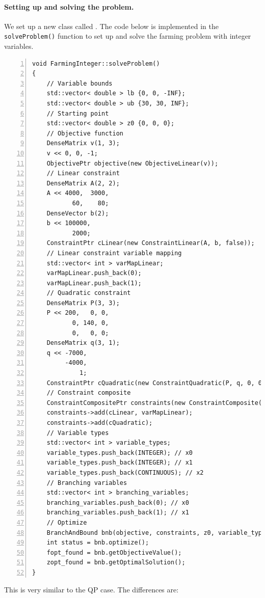 \paragraph{Setting up and solving the problem.} We set up a new  class called . The code below is implemented in the \texttt{solveProblem()} function to set up and solve the farming problem with integer variables.
\begin{lstlisting}[numbers=left]
void FarmingInteger::solveProblem()
{
	// Variable bounds
    std::vector< double > lb {0, 0, -INF};
    std::vector< double > ub {30, 30, INF};
    // Starting point
    std::vector< double > z0 {0, 0, 0};
    // Objective function
    DenseMatrix v(1, 3);
    v << 0, 0, -1;
    ObjectivePtr objective(new ObjectiveLinear(v));
    // Linear constraint
    DenseMatrix A(2, 2);
    A << 4000,  3000,
           60,    80;
    DenseVector b(2);
    b << 100000,
           2000;
    ConstraintPtr cLinear(new ConstraintLinear(A, b, false));
    // Linear constraint variable mapping
    std::vector< int > varMapLinear;
    varMapLinear.push_back(0);
    varMapLinear.push_back(1);
    // Quadratic constraint
    DenseMatrix P(3, 3);
    P << 200,   0, 0,
           0, 140, 0,
           0,   0, 0;
    DenseMatrix q(3, 1);
    q << -7000,
         -4000,
             1;
    ConstraintPtr cQuadratic(new ConstraintQuadratic(P, q, 0, 0, 0));
    // Constraint composite
    ConstraintCompositePtr constraints(new ConstraintComposite(3, lb, ub));
    constraints->add(cLinear, varMapLinear);
    constraints->add(cQuadratic);
	// Variable types
    std::vector< int > variable_types;
    variable_types.push_back(INTEGER); // x0
    variable_types.push_back(INTEGER); // x1
    variable_types.push_back(CONTINUOUS); // x2
	// Branching variables
    std::vector< int > branching_variables;
    branching_variables.push_back(0); // x0
    branching_variables.push_back(1); // x1
    // Optimize
    BranchAndBound bnb(objective, constraints, z0, variable_types, branching_variables);
    int status = bnb.optimize();
    fopt_found = bnb.getObjectiveValue();
    zopt_found = bnb.getOptimalSolution();
}
\end{lstlisting}
This is very similar to the QP case. The differences are:

